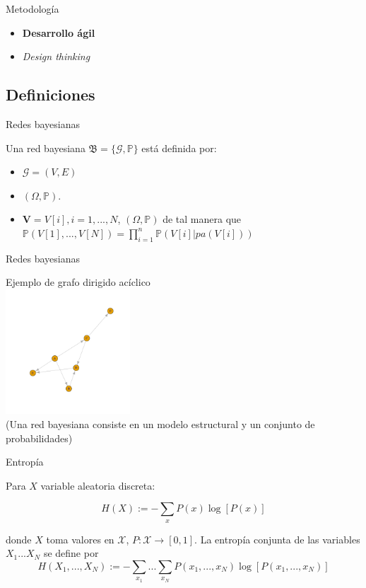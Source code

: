 \documentclass{beamer}
\begin{document}
\begin{frame}{Metodología}
	\begin{itemize}
		\item \textbf{Desarrollo ágil}
		\pause
		\item \textit{Design thinking}
	\end{itemize}
\end{frame}

\subsection{Definiciones}
\begin{frame}{Redes bayesianas}
    \begin{definition} 
        Una red bayesiana $\mathfrak{B} = \lbrace \mathcal{G}, \mathbb{P} \rbrace$ está definida por:
        \begin{itemize}
            \item $\mathcal{G}=(V,E)$ 
            \item $(\Omega, \mathbb{P})$.
            \item $\textbf{V}=V[i], i=1,...,N$, $(\Omega, \mathbb{P})$ 
            de tal manera que $\mathbb{P}(V[1],...,V[N])= \prod_{i=1}^{n}\mathbb{P}(V[i]|pa(V[i]))$
        \end{itemize}
    \end{definition}     
\end{frame}

\begin{frame}{Redes bayesianas}
	\begin{center}
		Ejemplo de grafo dirigido acíclico \\[12pt]
		\includegraphics[width=0.35\textwidth,keepaspectratio]{dag.png}
		\\
		\footnotesize(Una red bayesiana consiste en un modelo estructural y un conjunto de probabilidades)
    \end{center}
\end{frame}

\begin{frame}{Entropía}
	\begin{definition}[Entropía] \label{def:entropy}
        Para $X$ variable aleatoria discreta:  
        
        $$H(X):= - \sum_{x} P(x)\log[P(x)]$$
        
        donde $X$ toma valores en $\mathcal{X}$, $P:\mathcal{X} \rightarrow [0,1]$.
        La entropía conjunta de las variables $X_1...X_N$ se define por 
        $$H(X_1,...,X_N):=-\sum_{x_1}...\sum_{x_N}P(x_1,...,x_N)\log[P(x_1,...,x_N)]$$
    \end{definition}
\end{frame}
\end{document}
